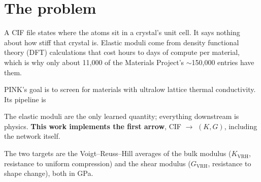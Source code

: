 \documentclass[11pt,a4paper]{article}
\newcommand{\KV}{$K_{\mathrm{VRH}}$}
\newcommand{\GV}{$G_{\mathrm{VRH}}$}
\begin{document}
\tableofcontents
\vspace{0.4cm}

\section{The problem}

A CIF file states where the atoms sit in a crystal's unit cell. It says nothing
about how stiff that crystal is. Elastic moduli come from density functional
theory (DFT) calculations that cost hours to days of compute per material, which
is why only about 11{,}000 of the Materials Project's $\sim$150{,}000 entries
have them.

PINK's goal is to screen for materials with ultralow lattice thermal
conductivity. Its pipeline is

\begin{center}
\end{center}

\noindent
The elastic moduli are the only learned quantity; everything downstream is
physics. \textbf{This work implements the first arrow}, CIF $\rightarrow$
$(K, G)$, including the network itself.

The two targets are the Voigt--Reuss--Hill averages of the bulk modulus
(\KV, resistance to uniform compression) and the shear modulus (\GV, resistance
to shape change), both in GPa.

\end{document}
